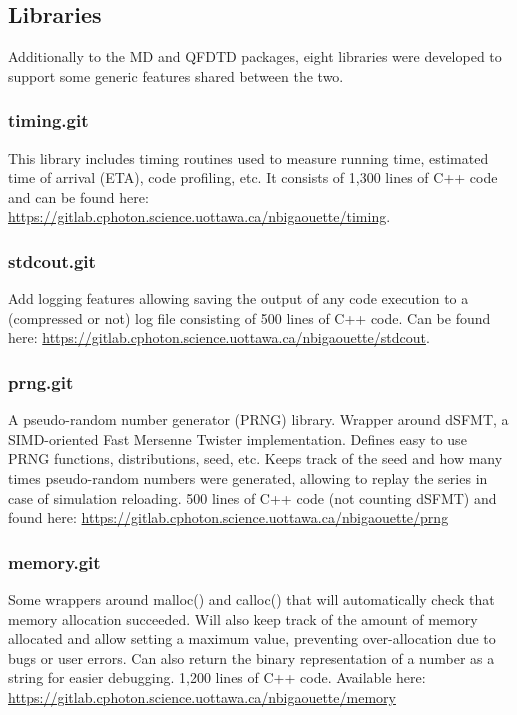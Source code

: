 \subsection{Libraries}
\label{section:tools:libraries}

Additionally to the MD and QFDTD packages, eight libraries were developed to
support some generic features shared between the two.


\subsubsection{timing.git} \label{section:tools:libraries:timing}

This library includes timing routines used to measure running time, estimated
time of arrival (ETA), code profiling, etc. It consists of 1,300 lines of C++
code and can be found here:
\url{https://gitlab.cphoton.science.uottawa.ca/nbigaouette/timing}.


\subsubsection{stdcout.git} \label{section:tools:libraries:stdcout}

Add logging features allowing saving the output of any code execution to a
(compressed or not) log file consisting of 500 lines of C++ code.
Can be found here:
\url{https://gitlab.cphoton.science.uottawa.ca/nbigaouette/stdcout}.


\subsubsection{prng.git} \label{section:tools:libraries:prng}

A pseudo-random number generator (PRNG) library. Wrapper around
dSFMT\cite{prng2009}, a SIMD-oriented Fast Mersenne Twister implementation.
Defines easy to use PRNG functions, distributions, seed, etc. Keeps track of
the seed and how many times pseudo-random numbers were generated, allowing
to replay the series in case of simulation reloading. 500 lines of C++ code
(not counting dSFMT) and found here:
\url{https://gitlab.cphoton.science.uottawa.ca/nbigaouette/prng}


\subsubsection{memory.git} \label{section:tools:libraries:memory}

Some wrappers around malloc() and calloc() that will automatically check that
memory allocation succeeded. Will also keep track of the amount of
memory allocated and allow setting a maximum value, preventing
over-allocation due to bugs or user errors. Can also return the binary
representation of a number as a string for easier debugging. 1,200 lines of
C++ code. Available here:
\url{https://gitlab.cphoton.science.uottawa.ca/nbigaouette/memory}


